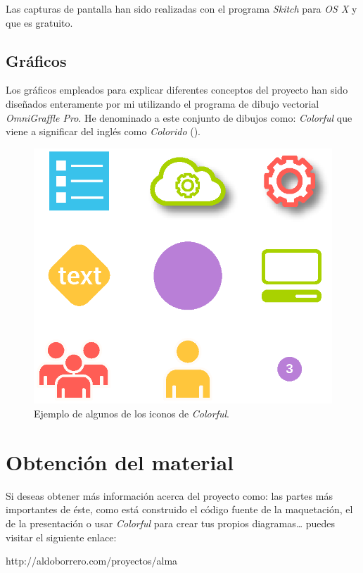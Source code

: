 Las capturas de pantalla han sido realizadas con el programa \textit{Skitch} para \textit{OS X} y que es gratuito.

\subsection{Gráficos}

Los gráficos empleados para explicar diferentes conceptos del proyecto han sido diseñados enteramente por mi utilizando el programa de dibujo vectorial \textit{OmniGraffle Pro}. He denominado a este conjunto de dibujos como: \textit{Colorful} que viene a significar del inglés como \textit{Colorido} (). 

\begin{figure}
\centering
\includegraphics[width=.8\linewidth]{../graphics/fig_ejemplo_colorful}
\caption{Ejemplo de algunos de los iconos de \textit{Colorful}.}
\label{fig:ejemplo_colorful}
\end{figure}

\section{Obtención del material}

Si deseas obtener más información acerca del proyecto como: las partes más importantes de éste, como está construido el código fuente de la maquetación, el de la presentación o usar \textit{Colorful} para crear tus propios diagramas\ldots{} puedes visitar el siguiente enlace:

\begin{pyglist}[language=html]
  http://aldoborrero.com/proyectos/alma
\end{pyglist}